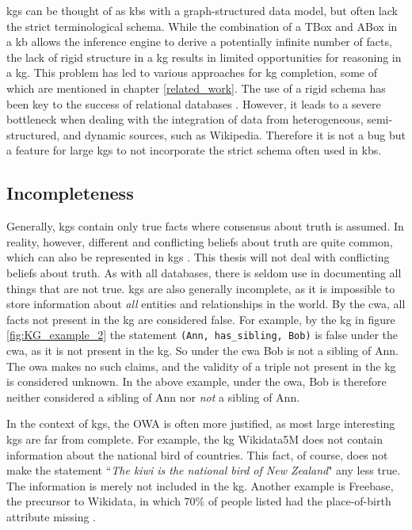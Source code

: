 \glspl{kg} can be thought of as \glspl{kb} with a graph-structured data model, but often lack the strict terminological schema. While the combination of a TBox and ABox in a \gls{kb} allows the inference engine to derive a potentially infinite number of facts, the lack of rigid structure in a \gls{kg} results in limited opportunities for reasoning in a \gls{kg}. This problem has led to various approaches for \gls{kg} completion, some of which are mentioned in chapter \ref{related_work}. The use of a rigid schema has been key to the success of relational databases \cite{codd2002relational}. However, it leads to a severe bottleneck when dealing with the integration of data from heterogeneous, semi-structured, and dynamic sources, such as Wikipedia. Therefore it is not a bug but a feature for large \glspl{kg} to not incorporate the strict schema often used in \glspl{kb}.

\subsection{Incompleteness}
\label{Integrity_of_KGs}
Generally, \glspl{kg} contain only true facts where consensus about truth is assumed. In reality, however, different and conflicting beliefs about truth are quite common, which can also be represented in \glspl{kg} \cite{subjective_kgs}. This thesis will not deal with conflicting beliefs about truth. As with all databases, there is seldom use in documenting all things that are not true. \glspl{kg} are also generally incomplete, as it is impossible to store information about \textit{all} entities and relationships in the world. By the \gls{cwa}, all facts not present in the \gls{kg} are considered false. For example, by the \gls{kg} in figure \ref{fig:KG_example_2} the statement \texttt{(Ann, has\_sibling, Bob)} is false under the \gls{cwa}, as it is not present in the \gls{kg}. So under the \gls{cwa} Bob is not a sibling of Ann. The \gls{owa} makes no such claims, and  the validity of a triple not present in the \gls{kg} is considered unknown. In the above example, under the \gls{owa}, Bob is therefore neither considered a sibling of Ann nor \textit{not} a sibling of Ann.

In the context of \glspl{kg}, the OWA is often more justified, as most large interesting \glspl{kg} are far from complete. For example, the \gls{kg} Wikidata5M does not contain information about the national bird of countries. This fact, of course, does not make the statement ``\textit{The kiwi is the national bird of New Zealand}" any less true. The information is merely not included in the \gls{kg}. Another example is Freebase, the precursor to Wikidata, in which 70\% of people listed had the place-of-birth attribute missing \cite{west2014knowledge}.

